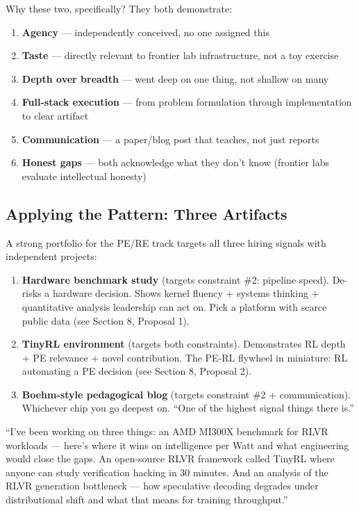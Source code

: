 Why these two, specifically? They both demonstrate:

\begin{enumerate}
  \item \textbf{Agency} --- independently conceived, no one assigned this
  \item \textbf{Taste} --- directly relevant to frontier lab infrastructure, not a toy exercise
  \item \textbf{Depth over breadth} --- went deep on one thing, not shallow on many
  \item \textbf{Full-stack execution} --- from problem formulation through implementation to clear artifact
  \item \textbf{Communication} --- a paper/blog post that teaches, not just reports
  \item \textbf{Honest gaps} --- both acknowledge what they don't know (frontier labs evaluate intellectual honesty)
\end{enumerate}

\subsection{Applying the Pattern: Three Artifacts}

A strong portfolio for the PE/RE track targets all three hiring signals with independent projects:

\begin{enumerate}
  \item \textbf{Hardware benchmark study} (targets constraint \#2: pipeline speed). De-risks a hardware decision. Shows kernel fluency + systems thinking + quantitative analysis leadership can act on. Pick a platform with scarce public data (see Section 8, Proposal 1).
  \item \textbf{TinyRL environment} (targets both constraints). Demonstrates RL depth + PE relevance + novel contribution. The PE-RL flywheel in miniature: RL automating a PE decision (see Section 8, Proposal 2).
  \item \textbf{Boehm-style pedagogical blog} (targets constraint \#2 + communication). Whichever chip you go deepest on. ``One of the highest signal things there is.''
\end{enumerate}

\begin{sayit}
``I've been working on three things: an AMD MI300X benchmark for RLVR workloads --- here's where it wins on intelligence per Watt and what engineering would close the gaps. An open-source RLVR framework called TinyRL where anyone can study verification hacking in 30 minutes. And an analysis of the RLVR generation bottleneck --- how speculative decoding degrades under distributional shift and what that means for training throughput.''
\end{sayit}

